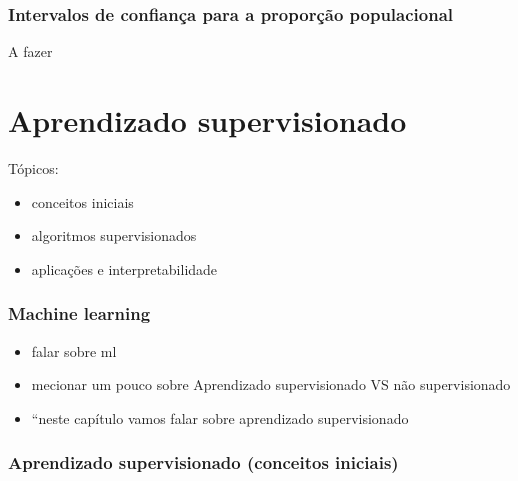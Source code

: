 \documentclass[
  letterpaper,
  DIV=11,
  numbers=noendperiod]{scrreprt}
\begin{document}
\hypertarget{intervalos-de-confianuxe7a-para-a-proporuxe7uxe3o-populacional}{%
\subsection{Intervalos de confiança para a proporção
populacional}\label{intervalos-de-confianuxe7a-para-a-proporuxe7uxe3o-populacional}}

A fazer


\hypertarget{aprendizado-supervisionado}{%
\chapter{Aprendizado supervisionado}\label{aprendizado-supervisionado}}

Tópicos:

\begin{itemize}
\item
  conceitos iniciais
\item
  algoritmos supervisionados
\item
  aplicações e interpretabilidade
\end{itemize}

\hypertarget{machine-learning}{%
\subsection{Machine learning}\label{machine-learning}}

\begin{itemize}
\item
  falar sobre ml
\item
  mecionar um pouco sobre Aprendizado supervisionado VS não
  supervisionado
\item
  ``neste capítulo vamos falar sobre aprendizado supervisionado
\end{itemize}

\hypertarget{aprendizado-supervisionado-conceitos-iniciais}{%
\subsection{Aprendizado supervisionado (conceitos
iniciais)}\label{aprendizado-supervisionado-conceitos-iniciais}}
\end{document}

